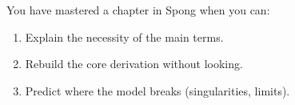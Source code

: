 \begin{summarybox}
    You have mastered a chapter in Spong when you can:
    \begin{enumerate}
        \item Explain the necessity of the main terms.
        \item Rebuild the core derivation without looking.
        \item Predict where the model breaks (singularities, limits).
    \end{enumerate}
\end{summarybox}

